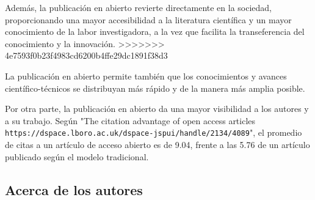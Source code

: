 \documentclass[10pt,twoside,spanish]{article}
\numberwithin{equation}{section}
\begin{document}
Además, la publicación en abierto revierte directamente en la sociedad, proporcionando una mayor accesibilidad a la literatura científica y un mayor conocimiento de la labor investigadora, a la vez que facilita la transeferencia del conocimiento y la innovación.
>>>>>>> 4e7593f0b23f4983cd6200b4ffe29dc1891f38d3

La publicación en abierto permite también que los conocimientos y avances científico-técnicos se distribuyan más rápido y de la manera más amplia posible.

Por otra parte, la publicación en abierto da una mayor visibilidad a los autores y a su trabajo. Según "The citation advantage of open access articles \texttt{https://dspace.lboro.ac.uk/dspace-jspui/handle/2134/4089}", el promedio de citas a un artículo de acceso abierto es de 9.04, frente a las 5.76 de un artículo publicado según el modelo tradicional.







\subsection*{Acerca de los autores}%
\end{document}
